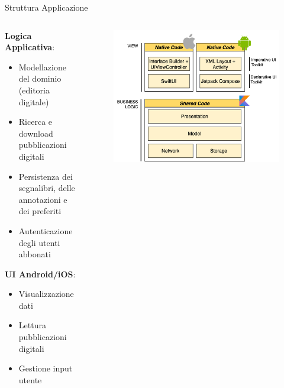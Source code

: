 \begin{frame}{Struttura Applicazione}
    \begin{columns}[onlytextwidth]
        \begin{column}{0.45\textwidth}

            \textbf{Logica Applicativa}:
            \begin{itemize}
                \item Modellazione del dominio (editoria digitale)
                \item Ricerca e download pubblicazioni digitali
                \item Persistenza dei segnalibri, delle annotazioni e dei preferiti
                \item Autenticazione degli utenti abbonati
            \end{itemize}

            \vspace{3mm}

            \textbf{UI Android/iOS}:
            \begin{itemize}
                \item Visualizzazione dati
                \item Lettura pubblicazioni digitali
                \item Gestione input utente
            \end{itemize}
            
        \end{column}
        \begin{column}{0.55\textwidth}
        
             \begin{figure}[H]
                \includegraphics[width=1\textwidth]{img/stack_kmm.png}
            \end{figure}
            
        \end{column}
    \end{columns}
\end{frame}

